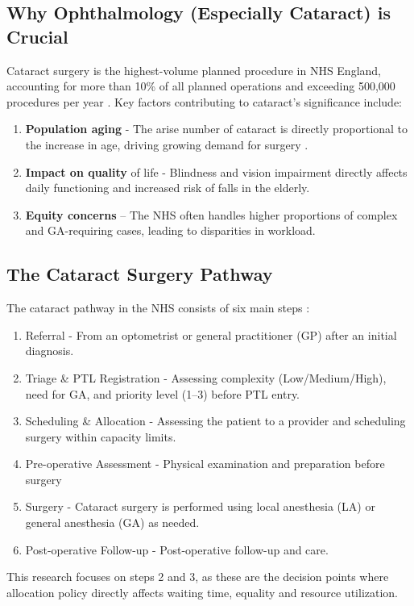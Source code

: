 \documentclass[ %
                    author={Nattanan Nawakitbamrung},
                supervisor={Dr. Sébastien Rochat},
                    degree={MSc},
                     title={Developing and Evaluating the Impact of a Single Patient Treatment List (PTL) for an NHS Integrated Care System},
                  subtitle={},
                      type={},
                      year={2025}]{dissertation}
\begin{document}
\subsection{Why Ophthalmology (Especially Cataract) is Crucial}
Cataract surgery is the highest-volume planned procedure in NHS England, accounting for more than 10\% of all planned operations and exceeding 500,000 procedures per year \cite{rcophth2021audit}. Key factors contributing to cataract's significance include:
\begin{enumerate}
    \item \textbf{Population aging} - The arise  number of cataract is directly proportional to the increase in age, driving growing demand for surgery \cite{who2023cataract}.
    \item \textbf{Impact on quality} of life - Blindness and vision impairment directly affects daily functioning and increased risk of falls in the elderly.
    \item \textbf{Equity concerns} – The NHS often handles higher proportions of complex and GA-requiring cases, leading to disparities in workload.
\end{enumerate}
\subsection{The Cataract Surgery Pathway}
The cataract pathway in the NHS consists of six main steps \cite{girft2022cataract}:
\begin{enumerate}
    \item Referral - From an optometrist or general practitioner (GP) after an initial diagnosis.
    \item Triage \& PTL Registration - Assessing complexity (Low/Medium/High), need for GA, and priority level (1–3) before PTL entry.
    \item Scheduling \& Allocation - Assessing the patient to a provider and scheduling surgery within capacity limits.
    \item Pre-operative Assessment - Physical examination and preparation before surgery
    \item Surgery - Cataract surgery is performed using local anesthesia (LA) or general anesthesia (GA) as needed.
    \item Post-operative Follow-up - Post-operative follow-up and care.
\end{enumerate}
This research focuses on steps 2 and 3, as these are the decision points where allocation policy directly affects waiting time, equality and resource utilization.
\end{document}
